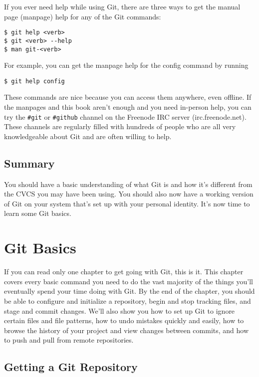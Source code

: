 \documentclass[a4paper]{book}
\newcommand{\chap}[1]{\newpage\thispagestyle{empty}\chapter{#1}\label{chap:\thechapter}}
\begin{document}
If you ever need help while using Git, there are three ways to get the manual page (manpage) help for any of the Git commands:

\begin{shaded}\begin{verbatim}
$ git help <verb>
$ git <verb> --help
$ man git-<verb>
\end{verbatim}\end{shaded}

For example, you can get the manpage help for the config command by running

\begin{shaded}\begin{verbatim}
$ git help config
\end{verbatim}\end{shaded}

These commands are nice because you can access them anywhere, even offline. If the manpages and this book aren't enough and you need in-person help, you can try the \texttt{\#git} or \texttt{\#github} channel on the Freenode IRC server (irc.freenode.net). These channels are regularly filled with hundreds of people who are all very knowledgeable about Git and are often willing to help.

\section{Summary}

You should have a basic understanding of what Git is and how it's different from the CVCS you may have been using. You should also now have a working version of Git on your system that's set up with your personal identity. It's now time to learn some Git basics.

\chap{Git Basics}

If you can read only one chapter to get going with Git, this is it. This chapter covers every basic command you need to do the vast majority of the things you'll eventually spend your time doing with Git. By the end of the chapter, you should be able to configure and initialize a repository, begin and stop tracking files, and stage and commit changes. We'll also show you how to set up Git to ignore certain files and file patterns, how to undo mistakes quickly and easily, how to browse the history of your project and view changes between commits, and how to push and pull from remote repositories.

\section{Getting a Git Repository}
\end{document}

